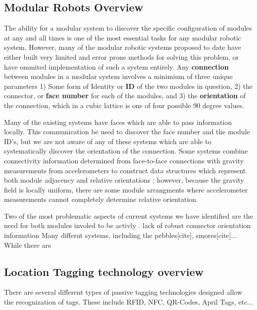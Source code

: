 \subsection{Modular Robots Overview}
\label{sec:RWconfiguration}
	The ability for a modular system to discover the specific configuration of modules at any and all times is one of the most essential tasks for any modular robotic system. However, many of the modular robotic systems proposed to date have either built very limited and error prone methods for solving this problem, or have ommited implementation of such a system entirely. Any \textbf{connection} between modules in a modular system involves a minimium of three unique parameters 1) Some form of Identity or \textbf{ID} of the two modules in question, 2) the connector, or \textbf{face number} for each of the modules, and 3) the \textbf{orientation} of the connection, which in a cubic lattice is one of four possible 90 degree values.

	Many of the existing systems have faces which are able to pass information locally. This communication be used to discover the face number and the module ID's, but we are not aware of any of these systems which are able to systematically discover the orientation of the connection. Some systems combine connectivity information determined from face-to-face connections with gravity measurements from accelerometers to construct data structures which represent both module adjacency and relative orientations \cite{Neubert2016}; however, because the gravity field is locally uniform, there are some module arrangments where accelerometer measurements cannot completely determine relative orientation.

	Two of the most problematic aspects of current systems we have identified are the need for both modules involed to be activly . lack of robust connector orientation information
	Many differnt systems, including the pebbles[cite], smores[cite]... While there are



\subsection{Location Tagging technology overview}
\label{sec:RWtaggingTech}

There are several different types of passive tagging technologies designed allow the recognization of tags. These include RFID, NFC, QR-Codes, April Tags, etc...
